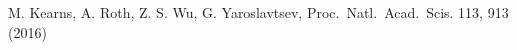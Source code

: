 \documentclass[USenglish,oneside,twocolumn]{article}
\begin{document}
\begin{thebibliography}{99}
 M. Kearns, A. Roth, Z. S. Wu, G. Yaroslavtsev, 
Proc.~Natl.~Acad.~Scis. 113, 913 (2016)

\end{thebibliography}
\end{document}
